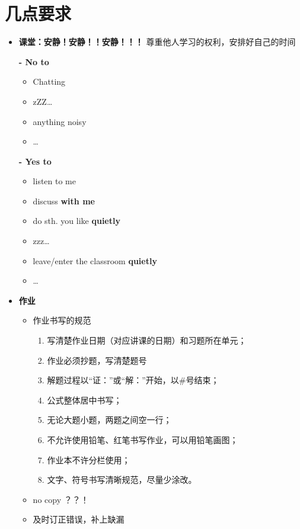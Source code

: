 \section{几点要求}
\begin{itemize}
	\item {\bf 课堂：安静！安静！！安静！！！}
	尊重他人学习的权利，安排好自己的时间
	
	{\bf - No to}
	  \begin{itemize}
	    \item Chatting
	    \item zZZ\ldots
	    \item anything noisy
	    \item \ldots
	  \end{itemize}
	{\bf - Yes to}
  \begin{itemize}
    \item listen to me
    \item discuss {\bf with me}
    \item do sth. you like {\bf quietly}
    \item zzz\ldots
    \item leave/enter the classroom {\bf quietly}
    \item \ldots
  \end{itemize}
  \item {\bf 作业}
  \begin{itemize}
    \item 作业书写的规范
    \begin{enumerate}
      \item 写清楚作业日期（对应讲课的日期）和习题所在单元；
      \item 作业必须抄题，写清楚题号
	  \item 解题过程以“证：”或“解：”开始，以$\#$号结束；
	  \item 公式整体居中书写；
	  \item 无论大题小题，两题之间空一行；
	  \item 不允许使用铅笔、红笔书写作业，可以用铅笔画图；
	  \item 作业本不许分栏使用；
	  \item 文字、符号书写清晰规范，尽量少涂改。
    \end{enumerate}    
    \item no copy ？？！
    \item 及时订正错误，补上缺漏
  \begin{center}

\end{center}
\end{itemize}
\end{itemize}
